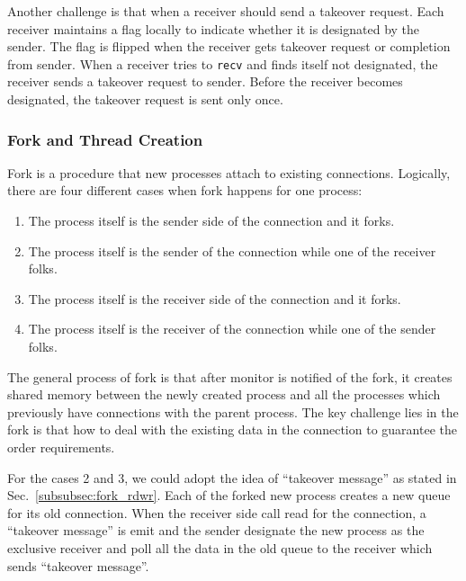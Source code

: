 Another challenge is that when a receiver should send a takeover request. Each receiver maintains a flag locally to indicate whether it is designated by the sender. The flag is flipped when the receiver gets takeover request or completion from sender. When a receiver tries to \texttt{recv} and finds itself not designated, the receiver sends a takeover request to sender. Before the receiver becomes designated, the takeover request is sent only once.


\subsubsection{Fork and Thread Creation}
\label{subsubsec:fork_fork}

Fork is a procedure that new processes attach to existing connections. Logically, there are four different cases when fork happens for one process:
\begin{enumerate}
	\item The process itself is the sender side of the connection and it forks.
	\item The process itself is the sender of the connection while one of the receiver folks.
	\item The process itself is the receiver side of the connection and it forks.
	\item The process itself is the receiver of the connection while one of the sender folks.
\end{enumerate}

The general process of fork is that after monitor is notified of the fork, it creates shared memory between the newly created process and all the processes which previously have connections with the parent process. The key challenge lies in the fork is that how to deal with the existing data in the connection to guarantee the order requirements.

For the cases 2 and 3, we could adopt the idea of ``takeover message'' as stated in Sec.~\ref{subsubsec:fork_rdwr}. Each of the forked new process creates a new queue for its old connection. When the receiver side call read for the connection, a ``takeover message'' is emit and the sender designate the new process as the exclusive receiver and poll all the data in the old queue to the receiver which sends ``takeover message''.

